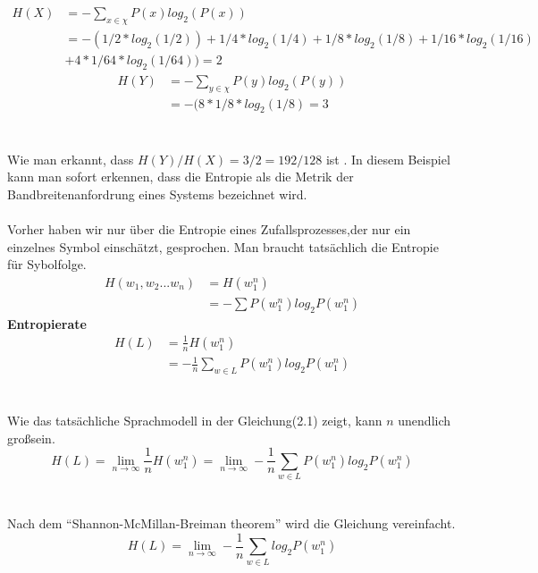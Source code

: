 \begin{align}
H(X) &=-\sum_{x\in\chi}P(x)log_{2}(P(x))\nonumber \\
		 &=-(1/2*log_{2}(1/2))+1/4*log_{2}(1/4)+1/8*log_{2}(1/8)+1/16*log_{2}(1/16)\nonumber \\
		 &+4*1/64*log_{2}(1/64))=2
\end{align}
\begin{align}
H(Y)&=-\sum_{y\in\chi}P(y)log_{2}(P(y))\\
	  &=-(8*1/8*log_{2}(1/8)=3
\end{align}
\\
\\
Wie man erkannt, dass $H(Y)/H(X)=3/2=192/128$ ist . In diesem Beispiel kann man sofort erkennen, dass die Entropie als die Metrik der Bandbreitenanfordrung eines Systems bezeichnet wird.
\\
\\   
Vorher haben wir nur \"uber die Entropie eines Zufallsprozesses,der nur ein einzelnes Symbol einsch\"atzt, gesprochen. Man braucht tats\"achlich die Entropie f\"ur Sybolfolge.
\begin{align}
H(w_{1},w_{2}...w_{n})&=H(w_{1}^{n})\nonumber \\
											&=-\sum{P(w_{1}^{n})log_{2}P(w_{1}^{n})}
\end{align}
\textbf{Entropierate}
\begin{align}
H(L)&=\frac{1}{n}H(w_{1}^{n})\nonumber \\
		&=-\frac{1}{n}\sum_{w\in L}P(w_{1}^{n})log_{2}P(w_{1}^{n})
\end{align}
\\
\\
Wie das tats\"achliche Sprachmodell in der Gleichung(2.1) zeigt, kann $n$ unendlich gro\ss  sein.
\begin{equation}
H(L)=\lim_{n\to\infty}\frac{1}{n}H(w_{1}^{n})=\lim_{n\to\infty}-\frac{1}{n}\sum_{w\in L}P(w_{1}^{n})log_{2}P(w_{1}^{n})
\end{equation}
\\
\\
Nach dem "`Shannon-McMillan-Breiman theorem"' wird die Gleichung vereinfacht.
\begin{equation}
H(L)=\lim_{n\to\infty}-\frac{1}{n}\sum_{w\in L}log_{2}P(w_{1}^{n})
\end{equation}
\\
\\
